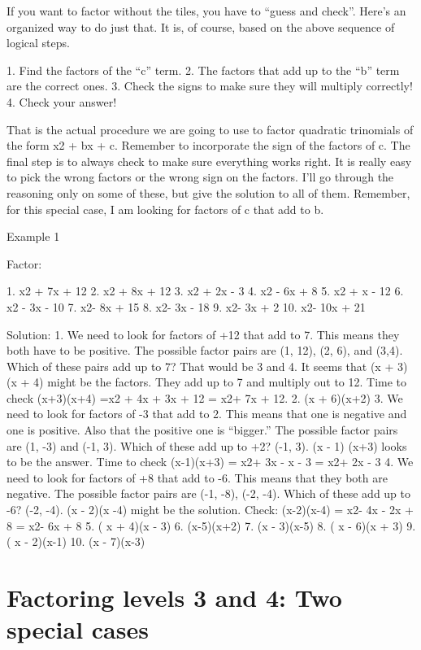 If you want to factor without the tiles, you have to ``guess and check''. Here's an organized way to do just that. It is, of course, based on the above sequence of logical steps.

1. Find the factors of the ``c'' term.
2. The factors that add up to the ``b'' term are the correct ones.
3. Check the signs to make sure they will multiply correctly!
4. Check your answer!

That is the actual procedure we are going to use to factor quadratic trinomials of the form x2 + bx + c. 
Remember to incorporate the sign of the factors of c. The final step is to always check to make sure everything works right. It is really easy to pick the wrong factors or the wrong sign on the factors. I'll go through the reasoning only on some of these, but give the solution to all of them. Remember, for this special case, I am looking for factors of c that add to b. 

Example 1

Factor: 

1. x2 + 7x + 12		2. x2 + 8x + 12		3. x2 + 2x - 3		4. x2 - 6x + 8
5. x2 + x - 12		6. x2 - 3x - 10		7. x2- 8x + 15		8. x2- 3x - 18
9. x2- 3x + 2		10. x2- 10x + 21

Solution:
1. We need to look for factors of +12 that add to 7. This means they both have to be positive. The possible factor pairs are (1, 12), (2, 6), and (3,4). Which of these pairs add up to 7? That would be 3 and 4. It seems that (x + 3)(x + 4) might be the factors. They add up to 7 and multiply out to 12. Time to check (x+3)(x+4) =x2 + 4x + 3x + 12 = x2+ 7x + 12.
2. (x + 6)(x+2)
3. We need to look for factors of -3 that add to 2. This means that one is negative and one is positive. Also that the positive one is ``bigger.'' The possible factor pairs are (1, -3) and (-1, 3). Which of these add up to +2? (-1, 3). (x - 1) (x+3) looks to be the answer. Time to check (x-1)(x+3) = x2+ 3x - x - 3 = x2+ 2x - 3
4. We need to look for factors of +8 that add to -6. This means that they both are negative. The possible factor pairs are (-1, -8), (-2, -4). Which of these add up to -6? (-2, -4). (x - 2)(x -4) might be the solution. Check: (x-2)(x-4) = x2- 4x - 2x + 8 = x2- 6x + 8
5. ( x + 4)(x - 3)
6. (x-5)(x+2)
7. (x - 3)(x-5)
8. ( x - 6)(x + 3)
9. ( x - 2)(x-1)
10. (x - 7)(x-3)

\section{Factoring levels 3 and 4: Two special cases}



